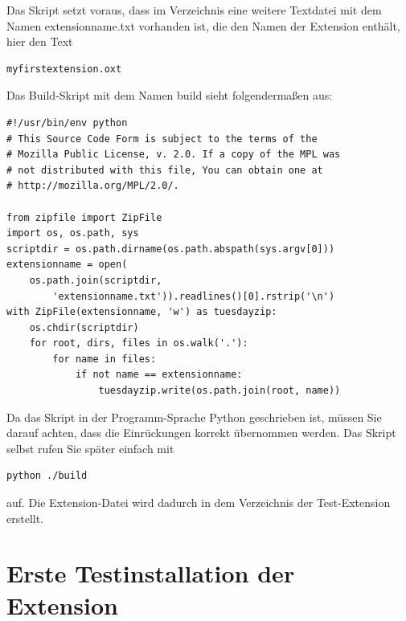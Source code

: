 \documentclass[a4paper,10pt,pagesize,titlepage]{scrbook}
\begin{document}
Das Skript setzt voraus, dass im Verzeichnis eine weitere Textdatei mit dem Namen extensionname.txt vorhanden ist, die den Namen der Extension enthält, hier den Text
\begin{lstlisting}
myfirstextension.oxt
\end{lstlisting}
Das Build-Skript mit dem Namen build sieht folgendermaßen aus:
\begin{lstlisting}
#!/usr/bin/env python
# This Source Code Form is subject to the terms of the 
# Mozilla Public License, v. 2.0. If a copy of the MPL was  
# not distributed with this file, You can obtain one at 
# http://mozilla.org/MPL/2.0/.

from zipfile import ZipFile
import os, os.path, sys
scriptdir = os.path.dirname(os.path.abspath(sys.argv[0]))
extensionname = open(
    os.path.join(scriptdir, 
        'extensionname.txt')).readlines()[0].rstrip('\n')
with ZipFile(extensionname, 'w') as tuesdayzip:
    os.chdir(scriptdir)
    for root, dirs, files in os.walk('.'):
        for name in files:
            if not name == extensionname:
                tuesdayzip.write(os.path.join(root, name)) 
\end{lstlisting}
Da das Skript in der Programm-Sprache Python geschrieben ist, müssen Sie darauf achten, dass die Einrückungen korrekt übernommen werden. Das Skript selbst rufen Sie später einfach mit
\begin{lstlisting}
python ./build
\end{lstlisting}
auf. Die Extension-Datei wird dadurch in dem Verzeichnis der Test-Extension erstellt.

\section{Erste Testinstallation der Extension}
\end{document}
